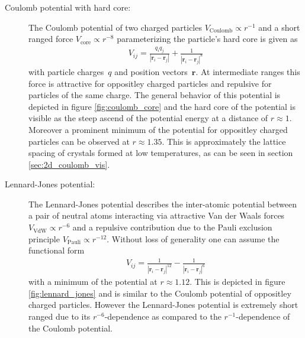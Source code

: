 \documentclass[11pt, a4paper]{article}
\numberwithin{equation}{section}
\begin{document}
\begin{description}
	\item[Coulomb potential with hard core:]
		The Coulomb potential of two charged particles $V_\mathrm{Coulomb} \propto r^{-1}$ and a short ranged force $V_\mathrm{core} \propto r^{-8}$ parameterizing the particle's hard core  is given as
		\begin{align*}
			V_{ij} = \frac{q_i q_j}{| \mathbf{r}_i - \mathbf{r}_j |} + \frac{1}{| \mathbf{r}_i - \mathbf{r}_j |^8}
		\end{align*}
		with particle charges~$q$ and position vectors~$\mathbf{r}$.
		At intermediate ranges this force is attractive for oppositley charged particles and repulsive for particles of the same charge.
		The general behavior of this potential is depicted in figure \ref{fig:coulomb_core} and the hard core of the potential is visible as the steep ascend of the potential energy at a distance of $r \approx 1$.
		Moreover a prominent minimum of the potential for oppositley charged particles can be observed at $r \approx 1.35$.
		This is approximately the lattice spacing of crystals formed at low temperatures, as can be seen in section \ref{sec:2d_coulomb_vis}.
		
	\item[Lennard-Jones potential:]
		The Lennard-Jones potential describes the inter-atomic potential between a pair of neutral atoms interacting via attractive Van der Waals forces $V_\mathrm{VdW} \propto r^{-6}$ and a repulsive contribution due to the Pauli exclusion principle $V_\mathrm{Pauli} \propto r^{-12}$.
		Without loss of generality one can assume the functional form
		\begin{align*}
			V_{ij} = \frac{1}{| \mathbf{r}_i - \mathbf{r}_j |^{12}} - \frac{1}{| \mathbf{r}_i - \mathbf{r}_j |^6}
		\end{align*}
		with a minimum of the potential at $r\approx \num{1.12}$.
		This is depicted in figure \ref{fig:lennard_jones} and is similar to the Coulomb potential of oppositley charged particles.
		However the Lennard-Jones potential is extremely short ranged due to its $r^{-6}$-dependence as compared to the $r^{-1}$-dependence of the Coulomb potential.
				
\end{description}
\end{document}

